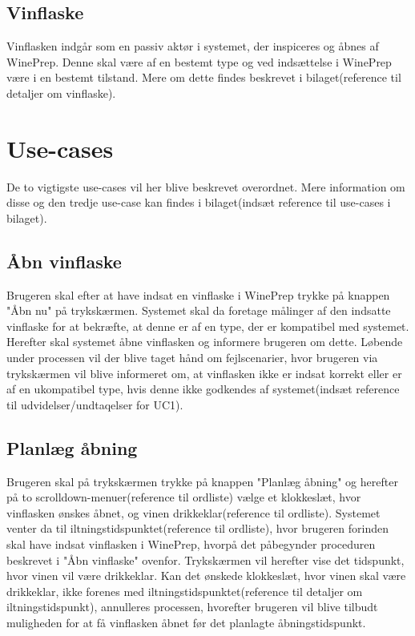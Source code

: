 \subsection{Vinflaske}
Vinflasken indgår som en passiv aktør i systemet, der inspiceres og åbnes af WinePrep. Denne skal være af en bestemt type og ved indsættelse i WinePrep være i 
en bestemt tilstand. Mere om dette findes beskrevet i bilaget(reference til detaljer om vinflaske).

\section{Use-cases}
De to vigtigste use-cases vil her blive beskrevet overordnet. Mere information om disse og den tredje use-case kan findes i bilaget(indsæt reference til 
use-cases i bilaget).

\subsection{Åbn vinflaske}
Brugeren skal efter at have indsat en vinflaske i WinePrep trykke på knappen "Åbn nu" på trykskærmen. Systemet skal da foretage målinger af den indsatte 
vinflaske for at bekræfte, at denne er af en type, der er kompatibel med systemet. Herefter skal systemet åbne vinflasken og informere brugeren om dette. 
Løbende under processen vil der blive taget hånd om fejlscenarier, hvor brugeren via trykskærmen vil blive informeret om, at vinflasken ikke er indsat korrekt 
eller er af en ukompatibel type, hvis denne ikke godkendes af systemet(indsæt reference til udvidelser/undtaqelser for UC1).

\subsection{Planlæg åbning}
Brugeren skal på trykskærmen trykke på knappen "Planlæg åbning" og herefter på to scrolldown-menuer(reference til ordliste) vælge et klokkeslæt, hvor 
vinflasken ønskes åbnet, og vinen drikkeklar(reference til ordliste). Systemet venter da til iltningstidspunktet(reference til ordliste), hvor brugeren 
forinden skal have indsat vinflasken i WinePrep, hvorpå det påbegynder proceduren beskrevet i "Åbn vinflaske" ovenfor. Trykskærmen vil herefter vise det 
tidspunkt, hvor vinen vil være drikkeklar. Kan det ønskede klokkeslæt, hvor vinen skal være drikkeklar, ikke forenes med iltningstidspunktet(reference til 
detaljer om iltningstidspunkt), annulleres processen, hvorefter brugeren vil blive tilbudt muligheden for at få vinflasken åbnet før det planlagte
åbningstidspunkt.

